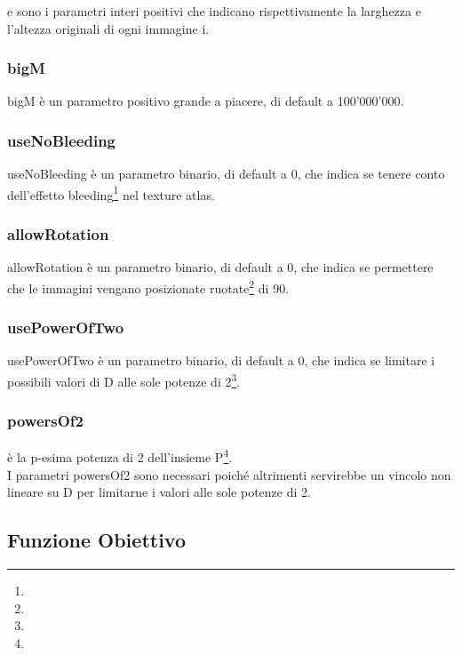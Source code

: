 \widthi{} e \heighti{} sono i parametri interi positivi che indicano rispettivamente la larghezza e l'altezza originali di ogni immagine i.

\subsubsection{bigM}
bigM è un parametro positivo grande a piacere, di default a 100’000’000. %

\subsubsection{useNoBleeding}
useNoBleeding è un parametro binario, di default a 0, che indica se tenere conto dell'effetto bleeding\footnote{\footBleeding} nel texture atlas. 

\subsubsection{allowRotation}
allowRotation è un parametro binario, di default a 0, che indica se permettere che le immagini vengano posizionate ruotate\footnote{\footRotation} di 90\degree.%


\subsubsection{usePowerOfTwo}
usePowerOfTwo è un parametro binario, di default a 0, che indica se limitare i possibili valori di D alle sole potenze di 2\footnote{\footTwoPowers}.

\subsubsection{powersOf2}
\powersOfTp{} è la p-esima potenza di 2 dell'insieme P\footnote{\footFreedom}. \\
I parametri powersOf2 sono necessari poiché altrimenti servirebbe un vincolo non lineare su D per limitarne i valori alle sole potenze di 2. \\






\newpage






\subsection{Funzione Obiettivo}
\iffalse
\begin{math}
 minimize D
\end{math}
\fi

